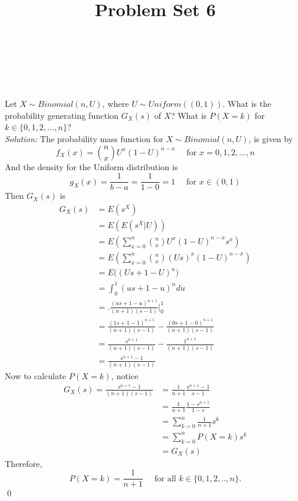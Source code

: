 \documentclass[10pt]{amsart}
\begin{document}
\noindent
{} \\
 \\
 \\
\title{Problem Set 6}
\maketitle

 Let $X\sim Binomial(n,U)$, where $U\sim Uniform((0,1))$. What is the probability generating function $G_X(s)$ of $X$? What is $P(X=k)$ for $k\in \{0,1,2,...,n\}$? \\

\noindent
\textit{Solution:}
The probability mass function for $X\sim Binomial(n,U)$, is given by
$$ f_X(x) = {n \choose x} U^x (1 - U)^{n - x} \quad \text{ for } x = 0, 1, 2, ..., n$$
And the density for the Uniform distribution is 
$$g_X(x) = \frac 1 {b - a} = \frac 1 {1 - 0} = 1 \quad \text{ for } x \in (0, 1)$$
Then $G_X(s)$ is
\begin{align*}
G_X(s) &= E(s^X) \\
	&= E(E(s^X | U )) \\
	&= E\left(\sum_{x=0}^n {n \choose x} U^x (1 - U)^{n - x}s^x\right) \\
	&= E\left(\sum_{x=0}^n {n \choose x} (Us)^x (1 - U)^{n - x}\right) \\
	&= E\big( (Us + 1 - U)^n \big) \\
	&= \int_0^1 (us + 1 - u)^n du \\
	&= \bigg. \frac {(us + 1 - u)^{n + 1}}{(n + 1)(s - 1)} \Bigg|_0^1 \\
	&= \frac {(1s + 1 - 1)^{n + 1}}{(n + 1)(s - 1)} - \frac {(0s + 1 - 0)^{n + 1}}{(n + 1)(s - 1)} \\
	&= \frac {s^{n + 1}}{(n + 1)(s - 1)} - \frac {1^{n + 1}}{(n + 1)(s - 1)} \\
	&= \frac {s^{n + 1} - 1}{(n + 1)(s - 1)}
\end{align*}
Now to calculate $P(X = k)$, notice
\begin{align*}
G_X(s)
	= \frac {s^{n + 1} - 1}{(n + 1)(s - 1)}
	&= \frac 1 {n + 1} \frac {s^{n + 1} - 1}{s - 1} \\
	&= \frac 1 {n + 1} \frac {1 - s^{n + 1}}{1 - s} \\
	&= \sum_{k=0}^n \frac 1 {n + 1} s^k \\
	&= \sum_{k=0}^n P(X = k) s^k \\
	&= G_X(s)
\end{align*}
Therefore, $$ P(X = k) = \frac 1 {n + 1} \quad \text{ for all } k \in \{0, 1, 2, .., n\}. $$
\qed \\
\end{document}
